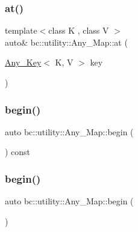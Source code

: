 \subsubsection{\texorpdfstring{at()}{at()}}
{\footnotesize\ttfamily template$<$class K , class V $>$ \\
auto\& bc\+::utility\+::\+Any\+\_\+\+Map\+::at (\begin{DoxyParamCaption}\item[{\hyperlink{structbc_1_1utility_1_1Any__Key}{Any\+\_\+\+Key}$<$ K, V $>$}]{key }\end{DoxyParamCaption})\hspace{0.3cm}{\ttfamily [inline]}}

\mbox{\label{classbc_1_1utility_1_1Any__Map_a2140500f599708a2eac39a6736df0c40}} 
\subsubsection{\texorpdfstring{begin()}{begin()}\hspace{0.1cm}{\footnotesize\ttfamily [1/2]}}
{\footnotesize\ttfamily auto bc\+::utility\+::\+Any\+\_\+\+Map\+::begin (\begin{DoxyParamCaption}{ }\end{DoxyParamCaption}) const\hspace{0.3cm}{\ttfamily [inline]}}

\mbox{\label{classbc_1_1utility_1_1Any__Map_a10ee269a7bb8dc9ddf1476042a2b3eab}} 
\subsubsection{\texorpdfstring{begin()}{begin()}\hspace{0.1cm}{\footnotesize\ttfamily [2/2]}}
{\footnotesize\ttfamily auto bc\+::utility\+::\+Any\+\_\+\+Map\+::begin (\begin{DoxyParamCaption}{ }\end{DoxyParamCaption})\hspace{0.3cm}{\ttfamily [inline]}}

